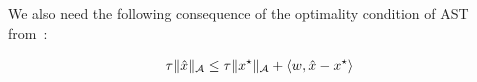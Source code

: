 \begin{subappendices}
We also need the following consequence of the optimality condition of AST from~\cite[Lemma 2]{btr12}:
\begin{prop}\label{pro:optimality}
\begin{align}
\tau \lVert\hat{x}\rVert_{\mathcal{A}} \leq \tau \lVert x^\star\rVert_{\mathcal{A}} + \langle w, \hat{x} - x^\star \rangle
\end{align}
\end{prop}


\end{subappendices}
